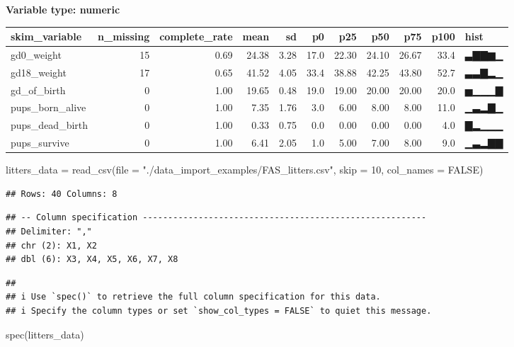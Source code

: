 \documentclass[
]{article}
\newenvironment{Shaded}{\begin{snugshade}}{\end{snugshade}}
\newcommand{\AttributeTok}[1]{\textcolor[rgb]{0.77,0.63,0.00}{#1}}
\newcommand{\ConstantTok}[1]{\textcolor[rgb]{0.00,0.00,0.00}{#1}}
\newcommand{\DecValTok}[1]{\textcolor[rgb]{0.00,0.00,0.81}{#1}}
\newcommand{\FunctionTok}[1]{\textcolor[rgb]{0.00,0.00,0.00}{#1}}
\newcommand{\NormalTok}[1]{#1}
\newcommand{\OtherTok}[1]{\textcolor[rgb]{0.56,0.35,0.01}{#1}}
\newcommand{\StringTok}[1]{\textcolor[rgb]{0.31,0.60,0.02}{#1}}
\begin{document}
\textbf{Variable type: numeric}

\begin{longtable}[]{@{}lrrrrrrrrrl@{}}
\toprule
skim\_variable & n\_missing & complete\_rate & mean & sd & p0 & p25 &
p50 & p75 & p100 & hist \\
\midrule
\endhead
gd0\_weight & 15 & 0.69 & 24.38 & 3.28 & 17.0 & 22.30 & 24.10 & 26.67 &
33.4 & ▃▇▇▆▁ \\
gd18\_weight & 17 & 0.65 & 41.52 & 4.05 & 33.4 & 38.88 & 42.25 & 43.80 &
52.7 & ▃▃▇▂▁ \\
gd\_of\_birth & 0 & 1.00 & 19.65 & 0.48 & 19.0 & 19.00 & 20.00 & 20.00 &
20.0 & ▅▁▁▁▇ \\
pups\_born\_alive & 0 & 1.00 & 7.35 & 1.76 & 3.0 & 6.00 & 8.00 & 8.00 &
11.0 & ▁▃▂▇▁ \\
pups\_dead\_birth & 0 & 1.00 & 0.33 & 0.75 & 0.0 & 0.00 & 0.00 & 0.00 &
4.0 & ▇▂▁▁▁ \\
pups\_survive & 0 & 1.00 & 6.41 & 2.05 & 1.0 & 5.00 & 7.00 & 8.00 & 9.0
& ▁▃▂▇▇ \\
\bottomrule
\end{longtable}

\begin{Shaded}
\begin{Highlighting}[]
\NormalTok{litters\_data }\OtherTok{=} \FunctionTok{read\_csv}\NormalTok{(}\AttributeTok{file =} \StringTok{"./data\_import\_examples/FAS\_litters.csv"}\NormalTok{,}
  \AttributeTok{skip =} \DecValTok{10}\NormalTok{, }\AttributeTok{col\_names =} \ConstantTok{FALSE}\NormalTok{)}
\end{Highlighting}
\end{Shaded}

\begin{verbatim}
## Rows: 40 Columns: 8
\end{verbatim}

\begin{verbatim}
## -- Column specification --------------------------------------------------------
## Delimiter: ","
## chr (2): X1, X2
## dbl (6): X3, X4, X5, X6, X7, X8
\end{verbatim}

\begin{verbatim}
## 
## i Use `spec()` to retrieve the full column specification for this data.
## i Specify the column types or set `show_col_types = FALSE` to quiet this message.
\end{verbatim}

\begin{Shaded}
\begin{Highlighting}[]
\FunctionTok{spec}\NormalTok{(litters\_data)}
\end{Highlighting}
\end{Shaded}
\end{document}
